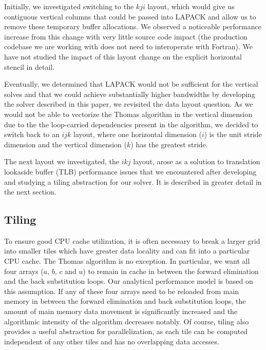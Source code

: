\documentclass[conference]{IEEEtran}
\begin{document}
Initially, we investigated switching to the \(kji\) layout, which would give us
contiguous vertical columns that could be passed into LAPACK and allow us to
remove these temporary buffer allocations. We observed a noticeable performance
increase from this change with very little source code impact (the production
codebase we are working with does not need to interoperate with Fortran). We
have not studied the impact of this layout change on the explicit horizontal
stencil in detail.

Eventually, we determined that LAPACK would not be sufficient for the vertical
solves and that we could achieve substantially higher bandwidths by developing
the solver described in this paper, we revisited the data layout question. As
we would not be able to vectorize the Thomas algorithm in the vertical
dimension due to the the loop-carried dependencies present in the algorithm, we
decided to switch back to an \(ijk\) layout, where one horizontal dimension (\(i\))
is the unit stride dimension and the vertical dimension (\(k\)) has the greatest
stride.

The next layout we investigated, the \(ikj\) layout, arose as a solution to
translation lookaside buffer (TLB) performance issues that we encountered after
developing and studying a tiling abstraction for our solver. It is described in
greater detail in the next section.

\subsection{Tiling}


To ensure good CPU cache utilization, it is often necessary to break a larger
grid into smaller tiles which have greater data locality and can fit into a
particular CPU cache. The Thomas algorithm is no exception. In particular, we
want all four arrays (\(a\), \(b\), \(c\) and \(u\)) to remain in cache in
between the forward elimination and the back substitution loops. Our analytical
performance model is based on this assumption. If any of these four arrays need
to be reloaded from main memory in between the forward elimination and back
substitution loops, the amount of main memory data movement is significantly
increased and the algorithmic intensity of the algorithm decreases notably. Of
course, tiling also provides a useful abstraction for parallelization, as each
tile can be computed independent of any other tiles and has no overlapping data
accesses.
\end{document}
